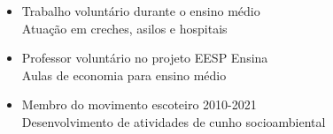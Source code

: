 \documentclass[11pt,letterpaper]{article}
\begin{document}
\hspace{-0.6cm}
\begin{minipage}[t]{.47\textwidth}
\begin{itemize}[itemsep = 0.1cm]
\item Trabalho voluntário durante o ensino médio\\
\small \indent Atuação em creches, asilos e hospitais\normalsize
\item Professor voluntário no projeto EESP Ensina\\
\small \indent Aulas de economia para ensino médio\normalsize
\end{itemize}
\end{minipage}
\hfill
\begin{minipage}[t]{.47\textwidth}
\begin{itemize}[listparindent=\parindent]
\item Membro do movimento escoteiro 2010-2021\\
\small  Desenvolvimento de atividades de cunho socioambiental
\end{itemize}
\end{minipage}
\end{document}
